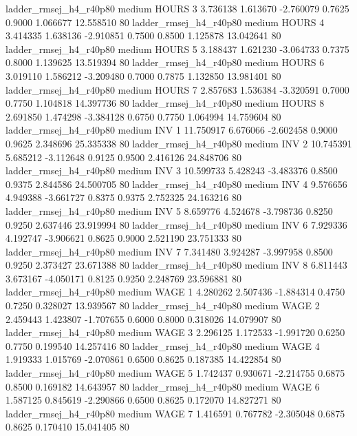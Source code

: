 ladder_rmsej_h4_r40p80     medium    HOURS                 3  3.736138 1.613670 -2.760079 0.7625 0.9000  1.066677   12.558510 80
ladder_rmsej_h4_r40p80     medium    HOURS                 4  3.414335 1.638136 -2.910851 0.7500 0.8500  1.125878   13.042641 80
ladder_rmsej_h4_r40p80     medium    HOURS                 5  3.188437 1.621230 -3.064733 0.7375 0.8000  1.139625   13.519394 80
ladder_rmsej_h4_r40p80     medium    HOURS                 6  3.019110 1.586212 -3.209480 0.7000 0.7875  1.132850   13.981401 80
ladder_rmsej_h4_r40p80     medium    HOURS                 7  2.857683 1.536384 -3.320591 0.7000 0.7750  1.104818   14.397736 80
ladder_rmsej_h4_r40p80     medium    HOURS                 8  2.691850 1.474298 -3.384128 0.6750 0.7750  1.064994   14.759604 80
ladder_rmsej_h4_r40p80     medium      INV                 1 11.750917 6.676066 -2.602458 0.9000 0.9625  2.348696   25.335338 80
ladder_rmsej_h4_r40p80     medium      INV                 2 10.745391 5.685212 -3.112648 0.9125 0.9500  2.416126   24.848706 80
ladder_rmsej_h4_r40p80     medium      INV                 3 10.599733 5.428243 -3.483376 0.8500 0.9375  2.844586   24.500705 80
ladder_rmsej_h4_r40p80     medium      INV                 4  9.576656 4.949388 -3.661727 0.8375 0.9375  2.752325   24.163216 80
ladder_rmsej_h4_r40p80     medium      INV                 5  8.659776 4.524678 -3.798736 0.8250 0.9250  2.637446   23.919994 80
ladder_rmsej_h4_r40p80     medium      INV                 6  7.929336 4.192747 -3.906621 0.8625 0.9000  2.521190   23.751333 80
ladder_rmsej_h4_r40p80     medium      INV                 7  7.341480 3.924287 -3.997958 0.8500 0.9250  2.373427   23.671388 80
ladder_rmsej_h4_r40p80     medium      INV                 8  6.811443 3.673167 -4.050171 0.8125 0.9250  2.248769   23.596881 80
ladder_rmsej_h4_r40p80     medium     WAGE                 1  4.280262 2.507436 -1.884314 0.4750 0.7250  0.328027   13.939567 80
ladder_rmsej_h4_r40p80     medium     WAGE                 2  2.459443 1.423807 -1.707655 0.6000 0.8000  0.318026   14.079907 80
ladder_rmsej_h4_r40p80     medium     WAGE                 3  2.296125 1.172533 -1.991720 0.6250 0.7750  0.199540   14.257416 80
ladder_rmsej_h4_r40p80     medium     WAGE                 4  1.919333 1.015769 -2.070861 0.6500 0.8625  0.187385   14.422854 80
ladder_rmsej_h4_r40p80     medium     WAGE                 5  1.742437 0.930671 -2.214755 0.6875 0.8500  0.169182   14.643957 80
ladder_rmsej_h4_r40p80     medium     WAGE                 6  1.587125 0.845619 -2.290866 0.6500 0.8625  0.172070   14.827271 80
ladder_rmsej_h4_r40p80     medium     WAGE                 7  1.416591 0.767782 -2.305048 0.6875 0.8625  0.170410   15.041405 80
